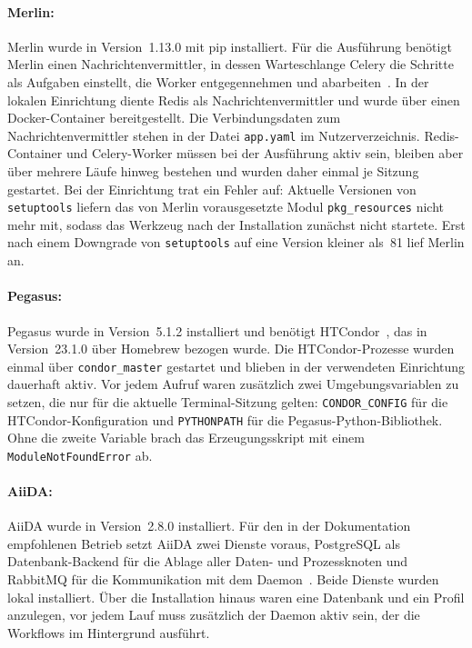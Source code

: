 \paragraph{Merlin:} Merlin wurde in Version~1.13.0 mit pip
installiert. Für die Ausführung benötigt Merlin einen
Nachrichtenvermittler, in dessen Warteschlange Celery die Schritte
als Aufgaben einstellt, die Worker entgegennehmen und
abarbeiten~\cite{merlindocs-celery}. In der lokalen Einrichtung diente Redis als Nachrichtenvermittler und wurde über einen Docker-Container bereitgestellt. Die Verbindungsdaten zum Nachrichtenvermittler stehen in der Datei \texttt{app.yaml} im Nutzerverzeichnis. Redis-Container und Celery-Worker müssen bei der Ausführung aktiv sein, bleiben aber über mehrere Läufe hinweg bestehen und wurden
daher einmal je Sitzung gestartet. Bei der Einrichtung trat ein
Fehler auf: Aktuelle Versionen von \texttt{setuptools} liefern das
von Merlin vorausgesetzte Modul \texttt{pkg\_resources} nicht mehr
mit, sodass das Werkzeug nach der Installation zunächst nicht
startete. Erst nach einem Downgrade von \texttt{setuptools} auf eine
Version kleiner als~81 lief Merlin an.

\paragraph{Pegasus:} Pegasus wurde in Version~5.1.2 installiert und
benötigt HTCondor~\cite{pegasusdocs-install}, das in Version~23.1.0 über
Homebrew bezogen wurde. Die HTCondor-Prozesse wurden einmal über
\texttt{condor\_master} gestartet und blieben in der verwendeten
Einrichtung dauerhaft aktiv. Vor jedem Aufruf waren zusätzlich zwei
Umgebungsvariablen zu setzen, die nur für die aktuelle
Terminal-Sitzung gelten: \texttt{CONDOR\_CONFIG} für die
HTCondor-Konfiguration und \texttt{PYTHONPATH} für die
Pegasus-Python-Bibliothek. Ohne die zweite Variable brach das
Erzeugungsskript mit einem \texttt{ModuleNotFoundError} ab.

\paragraph{AiiDA:} AiiDA wurde in Version~2.8.0 installiert. Für den in der Dokumentation empfohlenen Betrieb setzt AiiDA zwei Dienste voraus, PostgreSQL als Datenbank-Backend für die Ablage aller Daten- und Prozessknoten und RabbitMQ für die Kommunikation mit dem Daemon~\cite{aiidadocs-install}. Beide Dienste wurden lokal installiert. Über die Installation hinaus waren eine Datenbank und ein Profil anzulegen, vor jedem Lauf muss zusätzlich der Daemon aktiv sein, der die Workflows im Hintergrund ausführt.

